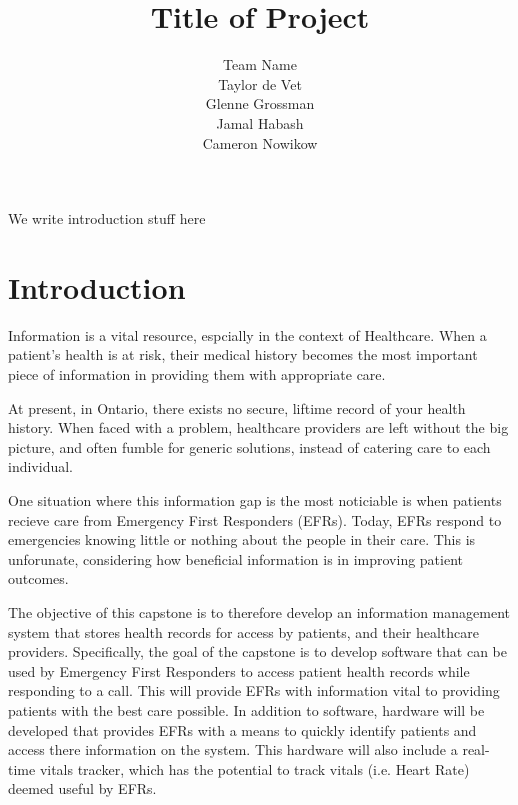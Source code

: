 \documentclass{article}
\title{Title of Project}
\author{Team Name
		\\ Taylor de Vet
    \\ Glenne Grossman
		\\ Jamal Habash
		\\ Cameron Nowikow
}
\date{}
\begin{document}
\newpage

\maketitle

We write introduction stuff here

\section{Introduction}

Information is a vital resource, espcially in the context of Healthcare. When a patient's health is at risk, their medical history becomes the most important piece of information in providing them with appropriate care.

At present, in Ontario, there exists no secure, liftime record of your health history. When faced with a problem, healthcare providers are left without the big picture, and often fumble for generic solutions, instead of catering care to each individual.

One situation where this information gap is the most noticiable is when patients recieve care from Emergency First Responders (EFRs). Today, EFRs respond to emergencies knowing little or nothing about the people in their care. This is unforunate, considering how beneficial information is in improving patient outcomes. \iffalse For example, nursing homes often carry documents that contain health information on their residents. This information, including medications, allergies and diagonsed disorders gives EFRs an important base-knowledge for how assessing a patient. \fi

The objective of this capstone is to therefore develop an information management system that stores health records for access by patients, and their healthcare providers. Specifically, the goal of the capstone is to develop software that can be used by Emergency First Responders to access patient health records while responding to a call. This will provide EFRs with information vital to providing patients with the best care possible. In addition to software, hardware will be developed that provides EFRs with a means to quickly identify patients and access there information on the system. This hardware will also include a real-time vitals tracker, which has the potential to track vitals (i.e. Heart Rate) deemed useful by EFRs.
\end{document}
